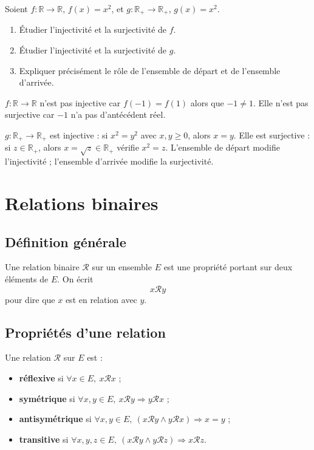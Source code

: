 \documentclass[11pt,a4paper]{article}
\newcommand{\R}{\mathbb{R}}
\newcommand{\et}{\wedge}
\newcommand{\imp}{\Rightarrow}
\newcommand{\troisetoiles}{\(\star\star\star\)}
\begin{document}
\begin{exercicebox}[5 -- Applications -- \troisetoiles]
Soient \(f:\R\to\R\), \(f(x)=x^2\), et \(g:\R_+\to\R_+\), \(g(x)=x^2\).
\begin{enumerate}
    \item Étudier l'injectivité et la surjectivité de \(f\).
    \item Étudier l'injectivité et la surjectivité de \(g\).
    \item Expliquer précisément le rôle de l'ensemble de départ et de l'ensemble d'arrivée.
\end{enumerate}
\end{exercicebox}

\begin{correctionbox}[5]
\(f:\R\to\R\) n'est pas injective car \(f(-1)=f(1)\) alors que \(-1\neq1\). Elle n'est pas surjective car \(-1\) n'a pas d'antécédent réel.

\(g:\R_+\to\R_+\) est injective : si \(x^2=y^2\) avec \(x,y\geq0\), alors \(x=y\). Elle est surjective : si \(z\in\R_+\), alors \(x=\sqrt z\in\R_+\) vérifie \(x^2=z\). L'ensemble de départ modifie l'injectivité ; l'ensemble d'arrivée modifie la surjectivité.
\end{correctionbox}

\section{Relations binaires}

\subsection{Définition générale}

\begin{definitionbox}
Une relation binaire \(\mathcal R\) sur un ensemble \(E\) est une propriété portant sur deux éléments de \(E\). On écrit
\[
x\mathcal R y
\]
pour dire que \(x\) est en relation avec \(y\).
\end{definitionbox}

\subsection{Propriétés d'une relation}

\begin{definitionbox}
Une relation \(\mathcal R\) sur \(E\) est :
\begin{itemize}
    \item \textbf{réflexive} si \(\forall x\in E,\ x\mathcal R x\) ;
    \item \textbf{symétrique} si \(\forall x,y\in E,\ x\mathcal R y\imp y\mathcal R x\) ;
    \item \textbf{antisymétrique} si \(\forall x,y\in E,\ (x\mathcal R y\et y\mathcal R x)\imp x=y\) ;
    \item \textbf{transitive} si \(\forall x,y,z\in E,\ (x\mathcal R y\et y\mathcal R z)\imp x\mathcal R z\).
\end{itemize}
\end{definitionbox}
\end{document}
